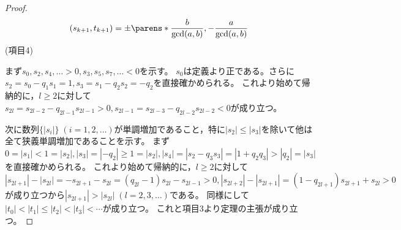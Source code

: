 \begin{proof}
            \[ (s_{k+1},t_{k+1}) = \pm\parens*{\frac{b}{\gcd(a,b)}, -\frac{a}{\gcd(a,b)}} \]
            \newline
            (項目4)
            \par
            まず$s_0,s_2,s_4,\dotsc>0,s_3,s_5,s_7,\dotsc<0$を示す。
            $s_0$は定義より正である。さらに$s_2 = s_0 - q_1s_1 = 1,s_3 = s_1 - q_2s_2 = -q_2$を直接確かめられる。
            これより始めて帰納的に，$l\geq 2$に対して$s_{2l} = s_{2l-2} - q_{2l-1}s_{2l-1} > 0,s_{2l-1} = s_{2l-3} - q_{2l-2}s_{2l-2} < 0$が成り立つ。
            \par
            次に数列$\{|s_i|\}\;(i=1,2,\dotsc)$が単調増加であること，特に$|s_2|\leq|s_3|$を除いて他は全て狭義単調増加であることを示す。
            まず$0 = |s_1| < 1 = |s_2|,|s_3| = |-q_2| \geq 1 = |s_2|,|s_4| = |s_2 - q_3s_3| = |1 + q_2q_3| > |q_2| = |s_3|$を直接確かめられる。
            これより始めて帰納的に，$l\geq 2$に対して$|s_{2l+1}| - |s_{2l}| = -s_{2l+1} - s_{2l} = (q_{2l}-1)s_{2l} - s_{2l-1} > 0,|s_{2l+2}| - |s_{2l+1}| = (1-q_{2l+1})s_{2l+1} + s_{2l} > 0$が成り立つから$|s_{2l+1}| > |s_{2l}|\;(l=2,3,\dotsc)$である。
            同様にして$|t_0| < |t_1| \leq |t_2| < |t_3| < \dotsb$が成り立つ。
            これと項目3より定理の主張が成り立つ。
        \end{proof}